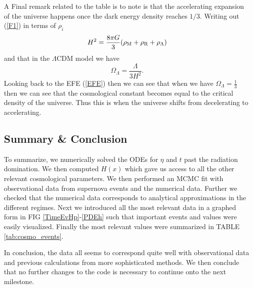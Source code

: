 \documentclass[%
reprint,
 amsmath,amssymb,
 aps,
]{revtex4-2}
\begin{document}
A Final remark related to the table is to note is that the accelerating expansion of the universe happens once the dark energy density reaches $1/3$. Writing out (\ref{F1}) in terms of $\rho_i$
\[H^2=\frac{8\pi G}{3}(\rho_\text M+\rho_\text{R}+\rho_\Lambda)\]
and that in the $\Lambda$CDM model we have
\[\Omega_\Lambda=\frac{\Lambda}{3H^2}.\]
Looking back to the EFE (\ref{EFE}) then we can see that when we have $\Omega_\Lambda=\frac13$ then we can see that the cosmological constant becomes equal to the critical density of the universe. Thus this is when the universe shifts from decelerating to accelerating.

\subsection{Summary \& Conclusion}

To summarize, we numerically solved the ODEs for $\eta$ and $t$ past the radiation domination. We then computed $H(x)$ which gave us access to all the other relevant cosmological parameters. We then performed an MCMC fit with observational data from supernova events and the numerical data. Further we checked that the numerical data corresponds to analytical approximations in the different regimes. Next we introduced all the most relevant data in a graphed form in FIG \ref{TimeEvHp}-\ref{PDEh} such that important events and values were easily visualized. Finally the most relevant values were summarized in TABLE \ref{tab:cosmo_events}.

In conclusion, the data all seems to correspond quite well with observational data and previous calculations from more sophisticated methods. We then conclude that no further changes to the code is necessary to continue onto the next milestone. 
\end{document}
